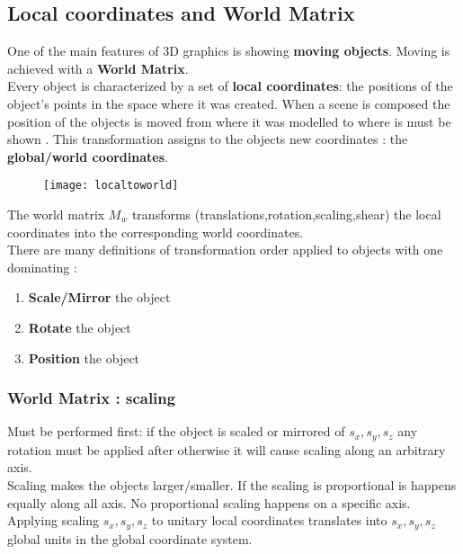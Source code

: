 \subsection{Local coordinates and World Matrix}
One of the main features of 3D graphics is showing \textbf{moving objects}. Moving is achieved with a \textbf{World Matrix}.\\
Every object is characterized by a set of \textbf{local coordinates}: the positions of the object's points in the space where it was created. When a scene is composed the position of the objects is moved from where it was modelled to where is must be shown . This transformation assigns to the objects new coordinates : the \textbf{global/world coordinates}.\\
\begin{figure}[H]
  \centering
  \texttt{[image: localtoworld]}
\end{figure}
The world matrix $M_w$ transforms (translations,rotation,scaling,shear) the local coordinates into the corresponding world coordinates.\\
There are many definitions of transformation order applied to objects with one dominating :
\begin{enumerate}
\item \textbf{Scale/Mirror} the object
\item \textbf{Rotate} the object
\item \textbf{Position} the object
\end{enumerate}

\subsubsection{World Matrix : scaling}
Must be performed first: if the object is scaled or mirrored of $s_x,s_y,s_z$ any rotation must be applied after otherwise it will cause scaling along an arbitrary axis.\\
Scaling makes the objects larger/smaller. If the scaling is proportional is happens equally along all axis. No proportional scaling happens on a specific axis. Applying scaling $s_x,s_y,s_z$ to unitary local coordinates translates into $s_x,s_y,s_z$ global units in the global coordinate system.

